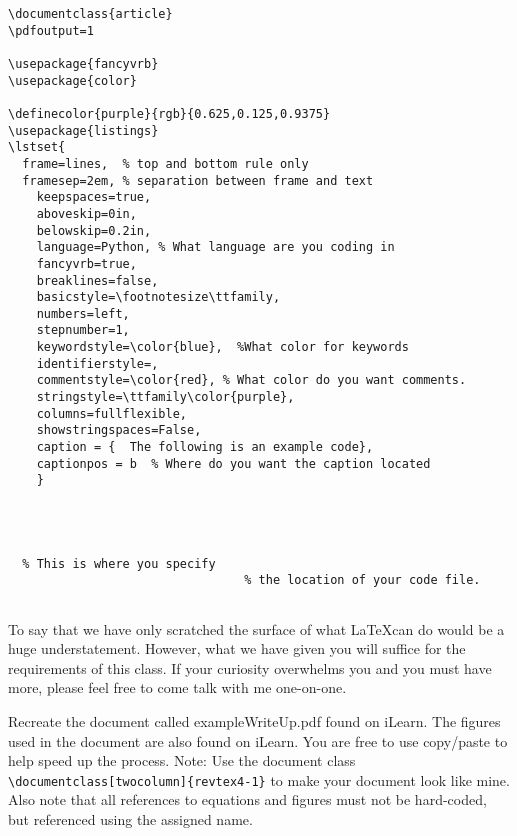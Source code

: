 \begin{Verbatim}
\documentclass{article}
\pdfoutput=1

\usepackage{fancyvrb}
\usepackage{color}

\definecolor{purple}{rgb}{0.625,0.125,0.9375}
\usepackage{listings}
\lstset{
  frame=lines,  % top and bottom rule only
  framesep=2em, % separation between frame and text
    keepspaces=true,
    aboveskip=0in,
    belowskip=0.2in,
    language=Python, % What language are you coding in
    fancyvrb=true,
    breaklines=false,
    basicstyle=\footnotesize\ttfamily,
    numbers=left,
    stepnumber=1,
    keywordstyle=\color{blue},  %What color for keywords
    identifierstyle=,
    commentstyle=\color{red}, % What color do you want comments.
    stringstyle=\ttfamily\color{purple},
    columns=fullflexible,
    showstringspaces=False,
    caption = {  The following is an example code},  
    captionpos = b  % Where do you want the caption located
    }




  % This is where you specify
                                 % the location of your code file.


\end{Verbatim}

To say that we have only scratched the surface of what \LaTeX can do
would be a huge understatement.  However, what we have given you will
suffice for the requirements of this class.  If your curiosity
overwhelms you and you must have more, please feel free to come talk
with me one-on-one.





\begin{enumerate}
  \prob Recreate the document called exampleWriteUp.pdf found on
  iLearn.  The figures used in the document are also found on
  iLearn. You are free to use copy/paste to help speed up the process.
Note:  Use the document class
\verb!\documentclass[twocolumn]{revtex4-1}!  to make your document
look like mine.
Also note that all references to equations and figures must not be
hard-coded, but referenced using the assigned name.


\end{enumerate}
